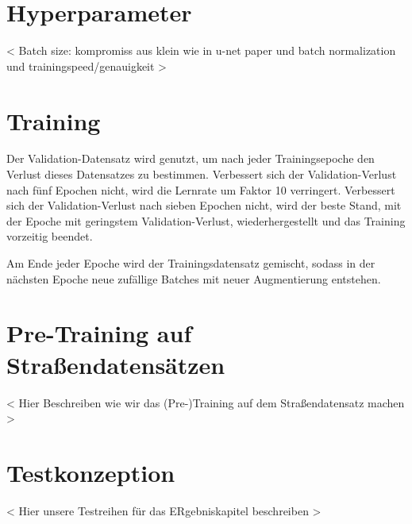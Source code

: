 \section{Hyperparameter}
< Batch size: kompromiss aus klein wie in u-net paper und batch normalization und trainingspeed/genauigkeit >

\section{Training} 

Der Validation-Datensatz wird genutzt, um nach jeder Trainingsepoche den Verlust dieses Datensatzes zu bestimmen. 
Verbessert sich der Validation-Verlust nach fünf Epochen nicht, wird die Lernrate um Faktor 10 verringert. 
Verbessert sich der Validation-Verlust nach sieben Epochen nicht, wird der beste Stand, mit der Epoche mit geringstem 
Validation-Verlust, wiederhergestellt und das Training vorzeitig beendet.  

Am Ende jeder Epoche wird der Trainingsdatensatz gemischt, sodass in der nächsten Epoche neue zufällige 
Batches mit neuer Augmentierung entstehen. 

\section{Pre-Training auf Straßendatensätzen} \label{sec:pre-training-roads}

< Hier Beschreiben wie wir das (Pre-)Training auf dem Straßendatensatz machen > 

\section{Testkonzeption}

< Hier unsere Testreihen für das ERgebniskapitel beschreiben > 



